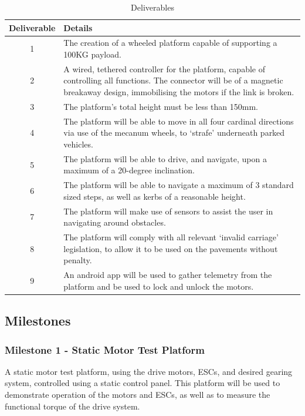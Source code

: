 \documentclass [12pt]{article}
\begin{document}
\begin{table}[H]
    \centering
    \setlength{\arrayrulewidth}{1.5pt}
    \begin{tabular}{|c| p{}|}
    \hline
    \cellcolor{gray!40}Deliverable & \cellcolor{gray!40}Details \\
    \hline
    1 & The creation of a wheeled platform capable of supporting a 100KG payload. \\
    \hline
    2 & A wired, tethered controller for the platform, capable of controlling all functions.
    The connector will be of a magnetic breakaway design, immobilising the motors if the link is broken. \\
    \hline
    3 & The platform’s total height must be less than 150mm. \\
    \hline
    4 & The platform will be able to move in all four cardinal directions via use of the mecanum wheels, to ‘strafe’ underneath parked vehicles. \\
    \hline
    5 & The platform will be able to drive, and navigate, upon a maximum of a 20-degree inclination. \\
    \hline
    6 & The platform will be able to navigate a maximum of 3 standard sized steps, as well as kerbs of a reasonable height. \\
    \hline
    7 & The platform will make use of sensors to assist the user in navigating around obstacles. \\
    \hline
    8 & The platform will comply with all relevant ‘invalid carriage’ legislation, to allow it to be used on the pavements without penalty. \\
    \hline
    9 & An android app will be used to gather telemetry from the platform and be used to lock and unlock the motors. \\
    \hline
    \end{tabular}
    \caption{Deliverables}
    \label{table:deliverables}
\end{table}

\subsection{Milestones}\label{sec:milestones}

\subsubsection{Milestone 1 - Static Motor Test Platform}
A static motor test platform, using the drive motors, ESCs, and desired gearing system, controlled using a static control panel. This platform will be used to demonstrate operation of the motors and ESCs, as well as to measure the functional torque of the drive system.
\end{document}
